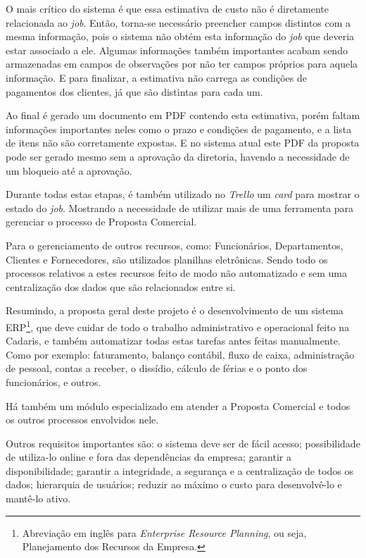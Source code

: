 \documentclass[
  12pt,				%
  openany,
  oneside,
  a4paper,			%
  english,			%
  brazil
]{article}
\numberwithin{figure}{section}
\numberwithin{table}{section}
\begin{document}
O mais crítico do sistema é que essa estimativa de custo não é diretamente relacionada ao \textit{job}. Então, torna-se necessário preencher campos distintos com a mesma informação, pois o sistema não obtém esta informação do \textit{job} que deveria estar associado a ele. Algumas informações também importantes acabam sendo armazenadas em campos de observações por não ter campos próprios para aquela informação. E para finalizar, a estimativa não carrega as condições de pagamentos dos clientes, já que são distintas para cada um.

Ao final é gerado um documento em PDF contendo esta estimativa, porém faltam informações importantes neles como o prazo e condições de pagamento, e a lista de itens não são corretamente expostas. E no sistema atual este PDF da proposta pode ser gerado mesmo sem a aprovação da diretoria, havendo a necessidade de um bloqueio até a aprovação.

Durante todas estas etapas, é também utilizado no \textit{Trello} um \textit{card} para mostrar o estado do \textit{job}. Mostrando a necessidade de utilizar mais de uma ferramenta para gerenciar o processo de Proposta Comercial.

Para o gerenciamento de outros recursos, como: Funcionários, Departamentos, Clientes e Fornecedores, são utilizados planilhas eletrônicas. Sendo todo os processos relativos a estes recursos feito de modo não automatizado e sem uma centralização dos dados que são relacionados entre si.

Resumindo, a proposta geral deste projeto é o desenvolvimento de um sistema ERP\footnote{Abreviação em inglês para \textit{Enterprise Resource Planning}, ou seja, Planejamento dos Recursos da Empresa.}, que deve cuidar de todo o trabalho administrativo e operacional feito na Cadaris, e também automatizar todas estas tarefas antes feitas manualmente. Como por exemplo: faturamento, balanço contábil, fluxo de caixa, administração de pessoal, contas a receber, o dissídio, cálculo de férias e o ponto dos funcionários, e outros.

Há também um módulo especializado em atender a Proposta Comercial e todos os outros processos envolvidos nele.

Outros requisitos importantes são: o sistema deve ser de fácil acesso; possibilidade de utiliza-lo online e fora das dependências da empresa; garantir a disponibilidade; garantir a integridade, a segurança e a centralização de todos os dados; hierarquia de usuários; reduzir ao máximo o custo para desenvolvê-lo e mantê-lo ativo.
\end{document}
